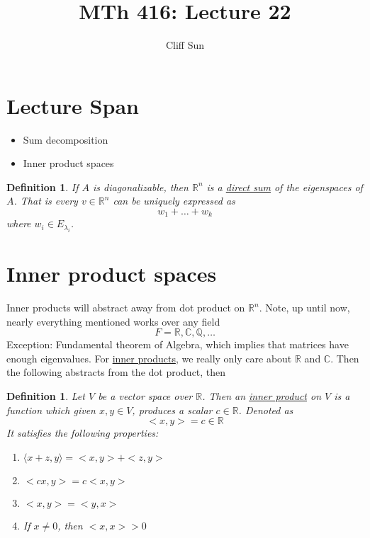 \documentclass{article}
\title{MTh 416: Lecture 22}
\author{Cliff Sun}
\newtheorem{definition}[theorem]{Definition}
\newtheorem{one minute paper}[theorem]{One Minute Paper}
\begin{document}
\maketitle

\section*{Lecture Span}
\begin{itemize}
    \item Sum decomposition
    \item Inner product spaces
\end{itemize}
\begin{definition}
    If $A$ is diagonalizable, then $\mathbb{R}^n$ is a \underline{direct sum} of the eigenspaces of $A$. That is every $v \in \mathbb{R}^n$ can be uniquely 
    expressed as 
    \begin{equation}
        w_1 + \dots + w_k
    \end{equation}
    where $w_i \in E_{\lambda_i}$. 
\end{definition}

\section*{Inner product spaces}

Inner products will abstract away from dot product on $\mathbb{R}^n$. Note, up until now, nearly everything mentioned works over any field 
\begin{equation}
    F = \mathbb{R}, \mathbb{C}, \mathbb{Q}, \dots 
\end{equation}
Exception: Fundamental theorem of Algebra, which implies that matrices have enough eigenvalues. For \underline{inner products}, we really only care about $\mathbb{R}$ and $\mathbb{C}$. Then the following
abstracts from the dot product, then 
\begin{definition}
    Let $V$ be a vector space over $\mathbb{R}$. Then an \underline{inner product} on $V$ is a function which given $x,y \in V$, produces a scalar $c \in \mathbb{R}$. Denoted as 
    \begin{equation}
        <x,y> = c \in \mathbb{R}
    \end{equation}
    It satisfies the following properties:
    \begin{enumerate}
        \item $\langle x+z,y \rangle = <x,y> + <z,y>$
        \item $<cx,y> = c<x,y>$
        \item $<x,y> = <y,x>$
        \item If $x \neq 0$, then $<x,x> > 0$
    \end{enumerate}
\end{definition}
\end{document}
